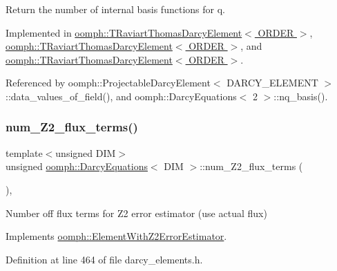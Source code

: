 Return the number of internal basis functions for q. 



Implemented in \hyperlink{classoomph_1_1TRaviartThomasDarcyElement_a38c41f037fc2b1386011b2c5d67c3f4f}{oomph\+::\+T\+Raviart\+Thomas\+Darcy\+Element$<$ O\+R\+D\+E\+R $>$}, \hyperlink{classoomph_1_1TRaviartThomasDarcyElement_aeff07bf55d4794ab817827c367ec49f8}{oomph\+::\+T\+Raviart\+Thomas\+Darcy\+Element$<$ O\+R\+D\+E\+R $>$}, and \hyperlink{classoomph_1_1TRaviartThomasDarcyElement_a27b5298596626c740e198efbd90ad8f0}{oomph\+::\+T\+Raviart\+Thomas\+Darcy\+Element$<$ O\+R\+D\+E\+R $>$}.



Referenced by oomph\+::\+Projectable\+Darcy\+Element$<$ D\+A\+R\+C\+Y\+\_\+\+E\+L\+E\+M\+E\+N\+T $>$\+::data\+\_\+values\+\_\+of\+\_\+field(), and oomph\+::\+Darcy\+Equations$<$ 2 $>$\+::nq\+\_\+basis().

\mbox{\label{classoomph_1_1DarcyEquations_a8315f65f0b04934eea304e60725a7268}} 
\subsubsection{\texorpdfstring{num\+\_\+\+Z2\+\_\+flux\+\_\+terms()}{num\_Z2\_flux\_terms()}}
{\footnotesize\ttfamily template$<$unsigned D\+IM$>$ \\
unsigned \hyperlink{classoomph_1_1DarcyEquations}{oomph\+::\+Darcy\+Equations}$<$ D\+IM $>$\+::num\+\_\+\+Z2\+\_\+flux\+\_\+terms (\begin{DoxyParamCaption}{ }\end{DoxyParamCaption})\hspace{0.3cm}{\ttfamily [inline]}, {\ttfamily [virtual]}}



Number off flux terms for Z2 error estimator (use actual flux) 



Implements \hyperlink{classoomph_1_1ElementWithZ2ErrorEstimator_ae82c5728902e13da31be19c390fc28e3}{oomph\+::\+Element\+With\+Z2\+Error\+Estimator}.



Definition at line 464 of file darcy\+\_\+elements.\+h.

